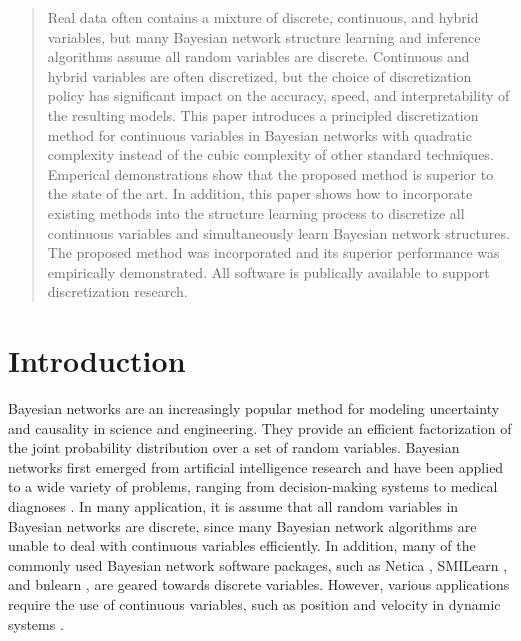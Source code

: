 \date{Received: date / Accepted: date}

\maketitle

\begin{abstract}

Real data often contains a mixture of discrete, continuous, and hybrid variables, but many Bayesian network structure learning and inference algorithms assume all random variables are discrete.
Continuous and hybrid variables are often discretized, but the choice of discretization policy has significant impact on the accuracy, speed, and interpretability of the resulting models.
This paper introduces a principled discretization method for continuous variables in Bayesian networks with quadratic complexity instead of the cubic complexity of other standard techniques.
Emperical demonstrations show that the proposed method is superior to the state of the art.
In addition, this paper shows how to incorporate existing methods into the structure learning process to discretize all continuous variables and simultaneously learn Bayesian network structures.
The proposed method was incorporated and its superior performance was empirically demonstrated.
All software is publically available to support discretization research.

\end{abstract}


\section{Introduction}

Bayesian networks \citep{Pearl_1988, PGM_2009} are an increasingly popular method for modeling uncertainty and causality in science and engineering.
They provide an efficient factorization of the joint probability distribution over a set of random variables.
Bayesian networks first emerged from artificial intelligence research and have been applied to a wide variety of problems, ranging from decision-making systems \citep{kochenderfer2012next} to medical diagnoses \citep{Lustgarten_2011}.
In many application, it is assume that all random variables in Bayesian networks are discrete, since many Bayesian network algorithms are unable to deal with continuous variables efficiently. In addition, many of the commonly used Bayesian network software packages, such as Netica \citep{netica1992}, SMILearn \citep{druzdzel1999smile}, and bnlearn \citep{bnlearn2010}, are geared towards discrete variables. However, various applications require the use of continuous variables, such as position and velocity in dynamic systems \citep{kochenderfer2010airspace}.

